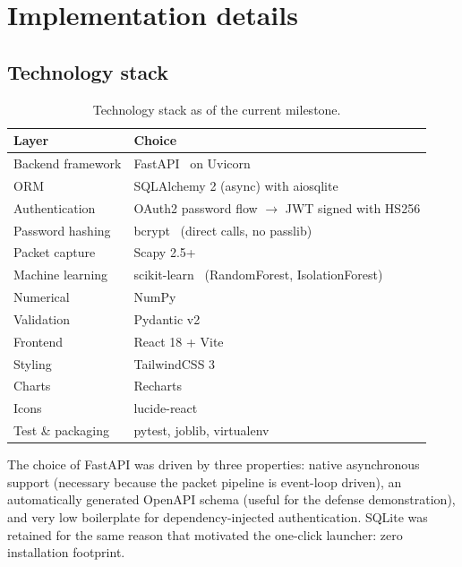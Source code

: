 \section{Implementation details}
\label{sec:implementation}

\subsection{Technology stack}

\begin{table}[h]
\centering
\small
\begin{tabularx}{\textwidth}{l X}
\toprule
\textbf{Layer} & \textbf{Choice} \\
\midrule
Backend framework            & FastAPI~\cite{ramirez2022fastapi} on Uvicorn \\
ORM                          & SQLAlchemy 2 (async) with aiosqlite \\
Authentication               & OAuth2 password flow $\rightarrow$ JWT signed with HS256 \\
Password hashing             & bcrypt~\cite{bcrypt} (direct calls, no passlib) \\
Packet capture               & Scapy 2.5+~\cite{scapy} \\
Machine learning             & scikit-learn~\cite{pedregosa2011scikit} (RandomForest, IsolationForest) \\
Numerical                    & NumPy \\
Validation                   & Pydantic v2 \\
Frontend                     & React 18 + Vite~\cite{vite} \\
Styling                      & TailwindCSS 3 \\
Charts                       & Recharts \\
Icons                        & lucide-react \\
Test \& packaging            & pytest, joblib, virtualenv \\
\bottomrule
\end{tabularx}
\caption{Technology stack as of the current milestone.}
\end{table}

The choice of FastAPI was driven by three properties: native asynchronous
support (necessary because the packet pipeline is event-loop driven), an
automatically generated OpenAPI schema (useful for the defense
demonstration), and very low boilerplate for dependency-injected
authentication. SQLite was retained for the same reason that motivated
the one-click launcher: zero installation footprint.


